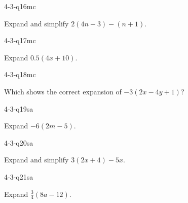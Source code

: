 \begin{practiceQuestion}{4-3-q16}{mc}
\begin{questionText}
Expand and simplify $2(4n - 3) - (n + 1)$.
\end{questionText}
\end{practiceQuestion}

\begin{practiceQuestion}{4-3-q17}{mc}
\begin{questionText}
Expand $0.5(4x + 10)$.
\end{questionText}
\end{practiceQuestion}

\begin{practiceQuestion}{4-3-q18}{mc}
\begin{questionText}
Which shows the correct expansion of $-3(2x - 4y + 1)$?
\end{questionText}
\end{practiceQuestion}


\begin{practiceQuestion}{4-3-q19}{sa}
\begin{questionText}
Expand $-6(2m - 5)$.
\end{questionText}
\end{practiceQuestion}

\begin{practiceQuestion}{4-3-q20}{sa}
\begin{questionText}
Expand and simplify $3(2x + 4) - 5x$.
\end{questionText}
\end{practiceQuestion}

\begin{practiceQuestion}{4-3-q21}{sa}
\begin{questionText}
Expand $\frac{3}{4}(8a - 12)$.
\end{questionText}
\end{practiceQuestion}

